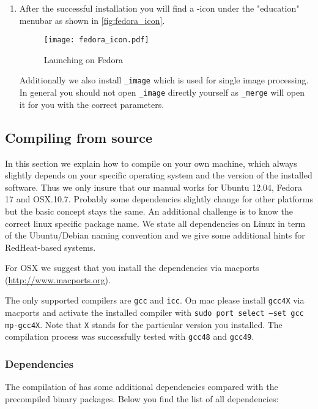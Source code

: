 \begin{enumerate}
	\item After the successful installation you will find a {\twodx}-icon under the "education" menubar as shown in \autoref{fig:fedora_icon}.
	
	\begin{figure}[H]
		\centering
		\texttt{[image: fedora\_icon.pdf]}
		\caption{Launching {\twodx} on Fedora}
		\label{fig:fedora_icon}
	\end{figure}
	
	Additionally we also install {\twodx}\texttt{\_image} which is used for single image processing. In general you should not open {\twodx}\texttt{\_image} directly yourself as {\twodx}\texttt{\_merge} will open it for you with the correct parameters.
	
\end{enumerate}

\newpage

\subsection{Compiling from source}
\label{sec:install_source}
In this section we explain how to compile {\twodx} on your own machine, which always slightly depends on your specific operating system and the version of the installed software. Thus we only insure that our manual works for Ubuntu 12.04, Fedora 17 and OSX.10.7. Probably some dependencies slightly change for other platforms but the basic concept stays the same. An additional challenge is to know the correct linux specific package name. We state all dependencies on Linux in term of the Ubuntu/Debian naming convention and we give some additional hints for RedHeat-based systems.

For OSX we suggest that you install the dependencies via macports (\url{http://www.macports.org}). 

The only supported compilers are \texttt{gcc} and \texttt{icc}. On mac please install \texttt{gcc4X} via macports and activate the installed compiler with \texttt{sudo port select --set gcc mp-gcc4X}. Note that \texttt{X} stands for the particular version you installed. The compilation process was successfully tested with \texttt{gcc48} and \texttt{gcc49}.

\subsubsection{Dependencies}
The compilation of {\twodx} has some additional dependencies compared with the precompiled binary packages. Below you find the list of all dependencies:

